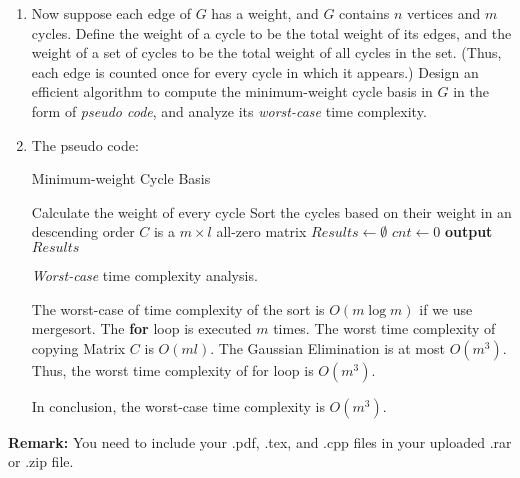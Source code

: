 \documentclass[12pt,a4paper]{article}
\makeatletter
\newtheorem*{solution}{Solution}
\theoremstyle{definition}
\renewenvironment{solution}[1][Solution] {\par\pushQED{\qed}\normalfont\topsep6\p@\@plus6\p@\relax\trivlist\item[\hskip\labelsep\bfseries#1\@addpunct{.}]\ignorespaces}{\popQED\endtrivlist\@endpefalse} \makeatother
\makeatother
\begin{document}
\begin{enumerate}
\begin{enumerate}
\item Now suppose each edge of $G$ has a weight, and $G$ contains $n$ vertices and $m$ cycles. Define the weight of a cycle to be the total weight of its edges, and the weight of a set of cycles to be the total weight of all cycles in the set. (Thus, each edge is counted once for every cycle in which it appears.) Design an efficient algorithm to compute the minimum-weight cycle basis in $G$ in the form of \emph{pseudo code}, and analyze its \emph{worst-case} time complexity.

    \begin{solution} The pseudo code:

    \begin{minipage}[t]{0.9\textwidth}
    \begin{algorithm}[H]
    	\BlankLine
    	\caption{Minimum-weight Cycle Basis}\label{Alg_MinimumCycleBasis}
    	\BlankLine
    	Calculate the weight of every cycle\;
        Sort the cycles based on their weight in an descending order\;
        \BlankLine
        $C$ is a $m\times l$ all-zero matrix\;
        $Results\leftarrow\emptyset$\;
        $cnt\leftarrow 0$\;
        \textbf{output} $Results$\;
    \end{algorithm}
    \end{minipage}

    \emph{Worst-case} time complexity analysis.

    The worst-case of time complexity of the sort is $O(m\log m)$ if we use mergesort. The \textbf{for} loop is executed $m$ times. The worst time complexity of copying Matrix $C$ is $O(ml)$. The Gaussian Elimination is at most $O(m^3)$. Thus, the worst time complexity of for loop is $O(m^3)$.

    In conclusion, the worst-case time complexity is $O(m^3)$.
    \end{solution}

\end{enumerate}

\end{enumerate}

\textbf{Remark:} You need to include your .pdf, .tex, and .cpp files in your uploaded .rar or .zip file.

\end{document}
